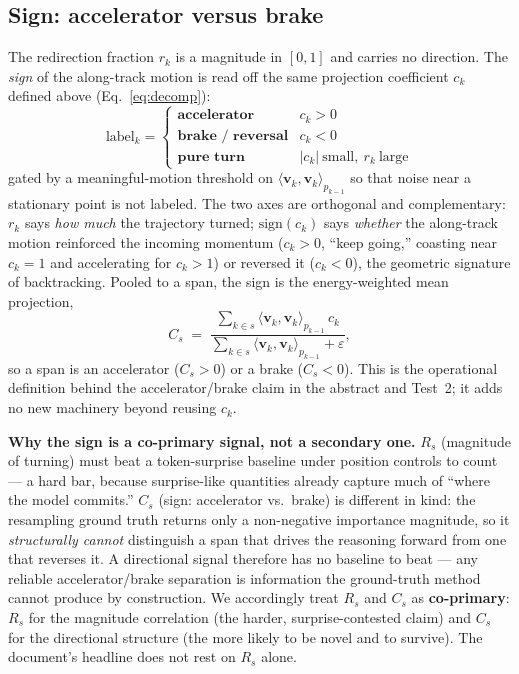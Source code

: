 \documentclass[11pt]{article}
\begin{document}
\subsection{Sign: accelerator versus brake}
\label{sec:sign}
The redirection fraction $r_k$ is a magnitude in $[0,1]$ and carries no direction. The \emph{sign} of the along-track motion is read off the same projection coefficient $c_k$ defined above (Eq.~\ref{eq:decomp}):
\begin{equation}
  \text{label}_k =
  \begin{cases}
    \textbf{accelerator} & c_k > 0 \\
    \textbf{brake / reversal} & c_k < 0 \\
    \textbf{pure turn} & |c_k|\ \text{small},\ r_k\ \text{large}
  \end{cases}
\end{equation}
gated by a meaningful-motion threshold on $\langle \bm{v}_k,\bm{v}_k\rangle_{p_{k-1}}$ so that noise near a stationary point is not labeled. The two axes are orthogonal and complementary: $r_k$ says \emph{how much} the trajectory turned; $\mathrm{sign}(c_k)$ says \emph{whether} the along-track motion reinforced the incoming momentum ($c_k>0$, ``keep going,'' coasting near $c_k=1$ and accelerating for $c_k>1$) or reversed it ($c_k<0$), the geometric signature of backtracking. Pooled to a span, the sign is the energy-weighted mean projection,
\begin{equation}
  C_s \;=\; \frac{\sum_{k\in s}\langle \bm{v}_k,\bm{v}_k\rangle_{p_{k-1}}\,c_k}{\sum_{k\in s}\langle \bm{v}_k,\bm{v}_k\rangle_{p_{k-1}}+\varepsilon},
\end{equation}
so a span is an accelerator ($C_s>0$) or a brake ($C_s<0$). This is the operational definition behind the accelerator/brake claim in the abstract and Test~2; it adds no new machinery beyond reusing $c_k$.

\begin{honestbox}
\textbf{Why the sign is a co-primary signal, not a secondary one.} $R_s$ (magnitude of turning) must beat a token-surprise baseline under position controls to count --- a hard bar, because surprise-like quantities already capture much of ``where the model commits.'' $C_s$ (sign: accelerator vs.\ brake) is different in kind: the resampling ground truth returns only a non-negative importance magnitude, so it \emph{structurally cannot} distinguish a span that drives the reasoning forward from one that reverses it. A directional signal therefore has no baseline to beat --- any reliable accelerator/brake separation is information the ground-truth method cannot produce by construction. We accordingly treat $R_s$ and $C_s$ as \textbf{co-primary}: $R_s$ for the magnitude correlation (the harder, surprise-contested claim) and $C_s$ for the directional structure (the more likely to be novel and to survive). The document's headline does not rest on $R_s$ alone.
\end{honestbox}
\end{document}
